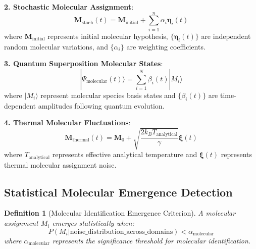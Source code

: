 \documentclass[11pt,a4paper]{article}
\newtheorem{definition}[theorem]{Definition}
\theoremstyle{remark}
\begin{document}
\textbf{2. Stochastic Molecular Assignment}:
\begin{equation}
\mathbf{M}_{\text{stoch}}(t) = \mathbf{M}_{\text{initial}} + \sum_{i=1}^n \alpha_i \boldsymbol{\eta}_i(t)
\end{equation}
where $\mathbf{M}_{\text{initial}}$ represents initial molecular hypothesis, $\{\boldsymbol{\eta}_i(t)\}$ are independent random molecular variations, and $\{\alpha_i\}$ are weighting coefficients.

\textbf{3. Quantum Superposition Molecular States}:
\begin{equation}
|\Psi_{\text{molecular}}(t)\rangle = \sum_{i=1}^N \beta_i(t) |M_i\rangle
\end{equation}
where $|M_i\rangle$ represent molecular species basis states and $\{\beta_i(t)\}$ are time-dependent amplitudes following quantum evolution.

\textbf{4. Thermal Molecular Fluctuations}:
\begin{equation}
\mathbf{M}_{\text{thermal}}(t) = \mathbf{M}_0 + \sqrt{\frac{2k_B T_{\text{analytical}}}{\gamma}} \boldsymbol{\xi}(t)
\end{equation}
where $T_{\text{analytical}}$ represents effective analytical temperature and $\boldsymbol{\xi}(t)$ represents thermal molecular assignment noise.

\subsection{Statistical Molecular Emergence Detection}

\begin{definition}[Molecular Identification Emergence Criterion]
A molecular assignment $M_i$ emerges statistically when:
$$P(M_i | \text{noise\_distribution\_across\_domains}) < \alpha_{\text{molecular}}$$
where $\alpha_{\text{molecular}}$ represents the significance threshold for molecular identification.
\end{definition}
\end{document}
